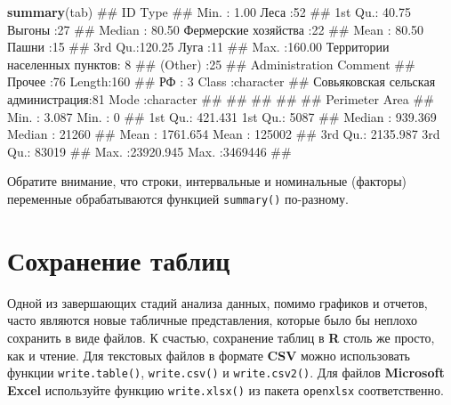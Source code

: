 \documentclass[]{book}
\newenvironment{Shaded}{\begin{snugshade}}{\end{snugshade}}
\newcommand{\KeywordTok}[1]{\textcolor[rgb]{0.13,0.29,0.53}{\textbf{#1}}}
\newcommand{\NormalTok}[1]{#1}
\begin{document}
\begin{Shaded}
\begin{Highlighting}[]
\KeywordTok{summary}\NormalTok{(tab)}
\NormalTok{##        ID                                    Type   }
\NormalTok{##  Min.   :  1.00   Леса                         :52  }
\NormalTok{##  1st Qu.: 40.75   Выгоны                       :27  }
\NormalTok{##  Median : 80.50   Фермерские хозяйства         :22  }
\NormalTok{##  Mean   : 80.50   Пашни                        :15  }
\NormalTok{##  3rd Qu.:120.25   Луга                         :11  }
\NormalTok{##  Max.   :160.00   Территории населенных пунктов: 8  }
\NormalTok{##                   (Other)                      :25  }
\NormalTok{##                              Administration   Comment         }
\NormalTok{##  Прочее                             :76     Length:160        }
\NormalTok{##  РФ                                 : 3     Class :character  }
\NormalTok{##  Совьяковская сельская администрация:81     Mode  :character  }
\NormalTok{##                                                               }
\NormalTok{##                                                               }
\NormalTok{##                                                               }
\NormalTok{##                                                               }
\NormalTok{##    Perimeter              Area        }
\NormalTok{##  Min.   :    3.087   Min.   :      0  }
\NormalTok{##  1st Qu.:  421.431   1st Qu.:   5087  }
\NormalTok{##  Median :  939.369   Median :  21260  }
\NormalTok{##  Mean   : 1761.654   Mean   : 125002  }
\NormalTok{##  3rd Qu.: 2135.987   3rd Qu.:  83019  }
\NormalTok{##  Max.   :23920.945   Max.   :3469446  }
\NormalTok{## }
\end{Highlighting}
\end{Shaded}

Обратите внимание, что строки, интервальные и номинальные (факторы)
переменные обрабатываются функцией \texttt{summary()} по-разному.

\section{Сохранение таблиц}\label{table_writing}

Одной из завершающих стадий анализа данных, помимо графиков и отчетов,
часто являются новые табличные представления, которые было бы неплохо
сохранить в виде файлов. К счастью, сохранение таблиц в \textbf{R} столь
же просто, как и чтение. Для текстовых файлов в формате \textbf{CSV}
можно использовать функции \texttt{write.table()}, \texttt{write.csv()}
и \texttt{write.csv2()}. Для файлов \textbf{Microsoft Excel} используйте
функцию \texttt{write.xlsx()} из пакета \texttt{openxlsx}
соответственно.
\end{document}

